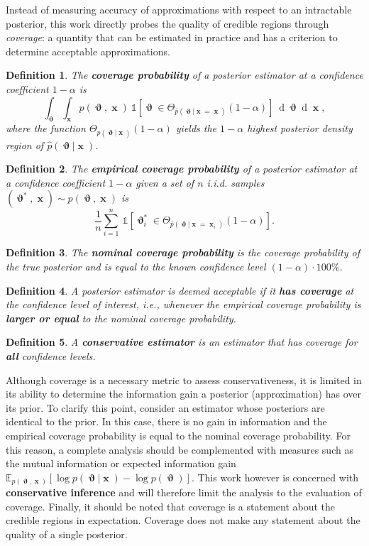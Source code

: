 \documentclass[twoside]{article}
\newtheorem{definition}{Definition}
\DeclareMathOperator{\vtheta}{\boldsymbol\vartheta}
\DeclareMathOperator{\vx}{\boldsymbol x}
\renewcommand*{\d}[1]{\operatorname{d}\!{#1}}
\begin{document}
Instead of measuring accuracy of approximations with respect to an intractable posterior, this work directly probes
the quality of credible regions through \emph{coverage}: a quantity that can be estimated in practice and has a criterion to determine acceptable approximations.
\begin{definition}
The {\bfseries coverage probability} of a posterior estimator at a confidence coefficient $1 - \alpha$ is
\begin{equation}
    \int_{\vtheta}\int_{\vx} p(\vtheta,\vx)~\mathbb{1}\left[\vtheta \in \Theta_{\hat{p}(\vtheta|\vx = \vx)}(1 - \alpha)\right]~\d\vtheta\d\vx,
\end{equation}
where the function
$\Theta_{p(\vtheta\vert\vx)}(1 - \alpha)$ yields the $1 - \alpha$ highest posterior density region
of $\hat{p}(\vtheta\vert\vx)$.
\end{definition}
\begin{definition}
The {\bfseries empirical coverage probability} of a posterior estimator at a confidence coefficient $1 - \alpha$ given a set of $n$ i.i.d. samples $(\vtheta^*,\vx)\sim p(\vtheta,\vx)$
is
\begin{equation}
\frac{1}{n} \sum_{i=1}^n ~\mathbb{1}\left[\vtheta^*_i \in \Theta_{\hat{p}(\vtheta|\vx = \vx_i)}(1 - \alpha)\right].
\end{equation}
\end{definition}
\begin{definition}
The {\bfseries nominal coverage probability} is the coverage probability of the true posterior and is equal to the known confidence level $(1 - \alpha)\cdot 100\%$.
\end{definition}
\begin{definition}
A posterior estimator is deemed acceptable if it {\bfseries has coverage} at the confidence level of interest, i.e., whenever the empirical coverage probability is {\bfseries larger or equal} to the nominal coverage probability.
\end{definition}
\begin{definition}
A {\bfseries conservative estimator} is an estimator that has coverage for {\bfseries all} confidence levels.
\end{definition}
Although coverage is a necessary metric to assess conservativeness, it is limited in its ability to determine the information gain a posterior (approximation) has over its prior. To clarify this point, consider an estimator whose posteriors are identical to the prior. In this case, there is no gain in information and the empirical coverage probability is equal to the nominal coverage probability. For this reason, a complete analysis should be complemented with measures such as the mutual information or expected information gain $\mathbb{E}_{p(\vtheta,\vx)}\left[\log p(\vtheta\vert\vx) - \log p(\vtheta)\right]$.
This work however is concerned with {\bfseries conservative inference} and will therefore limit the analysis to the evaluation of coverage. Finally, it should be noted that coverage is a statement about the credible regions in expectation. Coverage does not make any statement about the quality of a single posterior.
\end{document}
